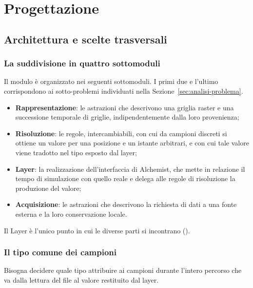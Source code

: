 \chapter{Progettazione}
\label{chap:progettazione}

\section{Architettura e scelte trasversali}
\label{sec:architettura-generale}

\subsection{La suddivisione in quattro sottomoduli}
\label{subsec:aree-modulo}

Il modulo è organizzato nei seguenti sottomoduli.
I primi due e l'ultimo corrispondono ai sotto-problemi individuati nella
Sezione~\ref{sec:analisi-problema}.

\begin{itemize}
    \item \textbf{Rappresentazione}: le astrazioni che descrivono una griglia raster e una
    successione temporale di griglie, indipendentemente dalla loro provenienza;
    \item \textbf{Risoluzione}: le regole, intercambiabili, con cui da campioni discreti si
    ottiene un valore per una posizione e un istante arbitrari, e con cui tale valore
    viene tradotto nel tipo esposto dal layer;
    \item \textbf{Layer}: la realizzazione dell'interfaccia di Alchemist, che mette in relazione il
    tempo di simulazione con quello reale e delega alle regole di risoluzione la produzione
    del valore;
    \item \textbf{Acquisizione}: le astrazioni che descrivono la richiesta di dati a una fonte
    esterna e la loro conservazione locale.
\end{itemize}

Il Layer è l'unico punto in cui le diverse parti si incontrano ().

\subsection{Il tipo comune dei campioni}
\label{subsec:tipo-campioni}

Bisogna decidere quale tipo attribuire ai
campioni durante l'intero percorso che va dalla lettura del file al valore restituito
dal layer.


